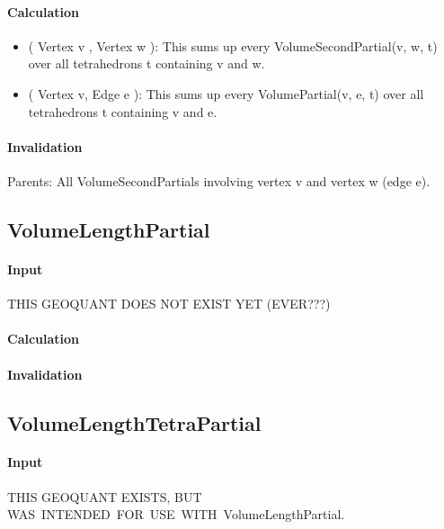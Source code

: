 \paragraph{Calculation}

\begin{itemize}
\item ( Vertex v , Vertex w ): This sums up every VolumeSecondPartial(v, w,
t) over all tetrahedrons t containing v and w.

\item ( Vertex v, Edge e ): This sums up every VolumePartial(v, e, t) over
all tetrahedrons t containing v and e.
\end{itemize}

\paragraph{Invalidation}

Parents: All VolumeSecondPartials involving vertex v and vertex w (edge e).

\subsection{VolumeLengthPartial}

\paragraph{Input}

THIS GEOQUANT DOES NOT EXIST YET (EVER???)

\paragraph{Calculation}

\paragraph{Invalidation}

\bigskip

\subsection{VolumeLengthTetraPartial}

\paragraph{Input}

THIS GEOQUANT EXISTS, BUT WAS\ INTENDED\ FOR\ USE\ WITH\
VolumeLengthPartial. 

